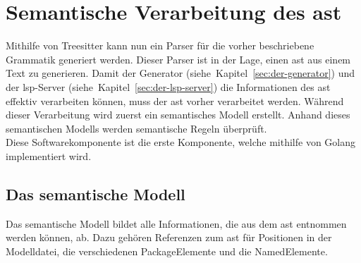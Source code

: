\documentclass[./einleitung.tex]{subfiles}
\begin{document}
    \section{Semantische Verarbeitung des \acrfull{ast}}\label{sec:semantische-verarbeitung-des-ast}
    Mithilfe von Treesitter kann nun ein Parser für die vorher beschriebene Grammatik generiert werden.
    Dieser Parser ist in der Lage, einen \acrshort{ast} aus einem Text zu generieren.
    Damit der Generator (siehe~Kapitel~\ref{sec:der-generator}) und der \acrshort{lsp}-Server (siehe~Kapitel~\ref{sec:der-lsp-server}) die Informationen des \acrshort{ast} effektiv verarbeiten können,
    muss der \acrshort{ast} vorher verarbeitet werden.
    Während dieser Verarbeitung wird zuerst ein semantisches Modell erstellt.
    Anhand dieses semantischen Modells werden semantische Regeln überprüft.\\

    Diese Softwarekomponente ist die erste Komponente, welche mithilfe von Golang implementiert wird.

    \subsection{Das semantische Modell}\label{subsec:das-semantische-modell}
    Das semantische Modell bildet alle Informationen, die aus dem \acrshort{ast} entnommen werden können, ab.
    Dazu gehören Referenzen zum \acrshort{ast} für Positionen in der Modelldatei, die verschiedenen PackageElemente und die NamedElemente.
\end{document}
